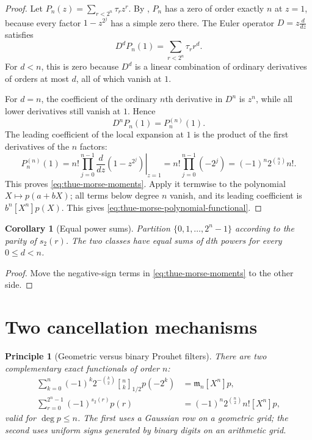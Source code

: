 \documentclass[11pt,oneside,openany]{book}
\newtheorem{corollary}[theorem]{Corollary}
\newtheorem{principle}[theorem]{Principle}
\theoremstyle{definition}
\theoremstyle{remark}
\newcommand{\Qbinom}[3]{\genfrac{[}{]}{0pt}{}{#1}{#2}_{#3}}
\begin{document}
\begin{proof}
Let
$P_n(z)=\sum_{r<2^n}\tau_rz^r$.  By , $P_n$ has a zero of order exactly $n$ at $z=1$, because every factor $1-z^{2^j}$ has a simple zero there.  The Euler operator $D=z\frac{d}{dz}$ satisfies
\[
 D^dP_n(1)=\sum_{r<2^n}\tau_rr^d.
\]
For $d<n$, this is zero because $D^d$ is a linear combination of ordinary derivatives of orders at most $d$, all of which vanish at $1$.

For $d=n$, the coefficient of the ordinary $n$th derivative in $D^n$ is $z^n$, while all lower derivatives still vanish at $1$.  Hence
\[
 D^nP_n(1)=P_n^{(n)}(1).
\]
The leading coefficient of the local expansion at $1$ is the product of the first derivatives of the $n$ factors:
\[
 P_n^{(n)}(1)
 =n!\prod_{j=0}^{n-1}\left.\frac{d}{dz}(1-z^{2^j})\right|_{z=1}
 =n!\prod_{j=0}^{n-1}(-2^j)
 =(-1)^n2^{\binom n2}n!.
\]
This proves \eqref{eq:thue-morse-moments}.  Apply it termwise to the polynomial $X\mapsto p(a+bX)$; all terms below degree $n$ vanish, and its leading coefficient is $b^n[X^n]p(X)$.  This gives \eqref{eq:thue-morse-polynomial-functional}.
\end{proof}

\begin{corollary}[Equal power sums]\label{cor:thue-morse-prouhet-partition}
Partition $\{0,1,\ldots,2^n-1\}$ according to the parity of $s_2(r)$.  The two classes have equal sums of $d$th powers for every $0\le d<n$.
\end{corollary}

\begin{proof}
Move the negative-sign terms in \eqref{eq:thue-morse-moments} to the other side.
\end{proof}

\section{Two cancellation mechanisms}

\begin{principle}[Geometric versus binary Prouhet filters]\label{prin:two-prouhet-filters}
There are two complementary exact functionals of order $n$:
\begin{align*}
 \sum_{k=0}^{n}(-1)^k2^{-\binom k2}\Qbinom nk{1/2}p(-2^k)
 &=\mathfrak m_n[X^n]p,\\
 \sum_{r=0}^{2^n-1}(-1)^{s_2(r)}p(r)
 &=(-1)^n2^{\binom n2}n![X^n]p,
\end{align*}
valid for $\deg p\le n$.  The first uses a Gaussian row on a geometric grid; the second uses uniform signs generated by binary digits on an arithmetic grid.
\end{principle}
\end{document}

